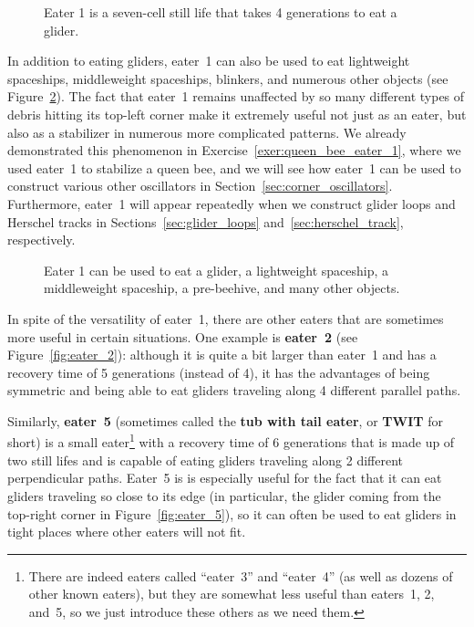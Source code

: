 \begin{figure}[!htb]
	\centering
	\caption{Eater 1 is a seven-cell still life that takes 4 generations to eat a glider.}\label{fig:eater_1}
\end{figure}

In addition to eating gliders, eater~1 can also be used to eat lightweight spaceships, middleweight spaceships, blinkers, and numerous other objects (see Figure~\ref{fig:eater_1_multi}). The fact that eater~1 remains unaffected by so many different types of debris hitting its top-left corner make it extremely useful not just as an eater, but also as a stabilizer in numerous more complicated patterns. We already demonstrated this phenomenon in Exercise~\ref{exer:queen_bee_eater_1}, where we used eater~1 to stabilize a queen bee, and we will see how eater~1 can be used to construct various other oscillators in Section~\ref{sec:corner_oscillators}. Furthermore, eater~1 will appear repeatedly when we construct glider loops and Herschel tracks in Sections~\ref{sec:glider_loops} and~\ref{sec:herschel_track}, respectively.

\begin{figure}[!htb]
	\centering{}
	\caption{Eater 1 can be used to eat a glider, a lightweight spaceship, a middleweight spaceship, a pre-beehive, and many other objects.}\label{fig:eater_1_multi}
\end{figure}

In spite of the versatility of eater~1, there are other eaters that are sometimes more useful in certain situations. One example is \textbf{eater~2} (see Figure~\ref{fig:eater_2}): although it is quite a bit larger than eater~1 and has a recovery time of 5 generations (instead of 4), it has the advantages of being symmetric and being able to eat gliders traveling along 4 different parallel paths.

Similarly, \textbf{eater~5} (sometimes called the \textbf{tub with tail eater}, or \textbf{TWIT} for short) is a small eater\footnote{There are indeed eaters called ``eater~3'' and ``eater~4'' (as well as dozens of other known eaters), but they are somewhat less useful than eaters~1, 2, and~5, so we just introduce these others as we need them.} with a recovery time of 6 generations that is made up of two still lifes and is capable of eating gliders traveling along 2 different perpendicular paths. Eater~5 is is especially useful for the fact that it can eat gliders traveling so close to its edge (in particular, the glider coming from the top-right corner in Figure~\ref{fig:eater_5}), so it can often be used to eat gliders in tight places where other eaters will not fit.


